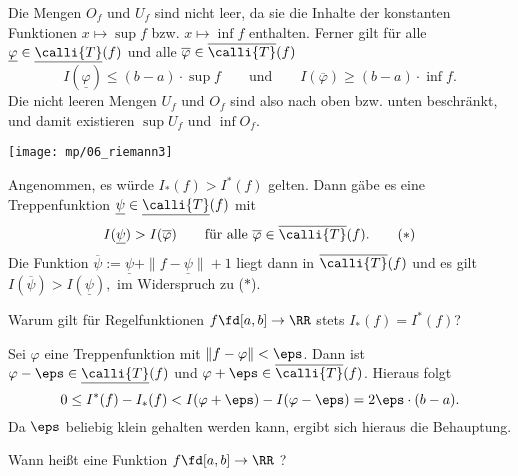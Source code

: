\begin{antwort}
Die Mengen $O_f$ und $U_f$ sind nicht leer, 
da sie die Inhalte der konstanten 
Funktionen $x\mapsto \sup f$ bzw. $x\mapsto \inf f$ enthalten. Ferner 
gilt für alle $\underline{\varphi}\in \underline{\calli{T}}(f)$ 
und alle $\overline{\varphi}\in \overline{\calli{T}}(f)$
\[
I(\underline{\varphi}) \le (b-a)\cdot \sup f 
\qquad\text{und}\qquad 
I(\overline{\varphi}) \ge (b-a)\cdot \inf f. 
\]
Die nicht leeren Mengen $U_f$ und $O_f$ sind also nach 
oben bzw. unten beschränkt, und damit existieren $\sup U_f$ und $\inf O_f$. 

\begin{center}
  \texttt{[image: mp/06\_riemann3]}
  \label{fig:06_riemann3}
\end{center}

Angenommen, es würde $I_* (f) > I^* (f)$ gelten. Dann gäbe es eine 
Treppenfunktion $\underline{\psi} \in \underline{\calli{T}}(f)$ mit 
\begin{equation}
I(\underline{\psi}) > I(\overline{\varphi}) \qquad\text {für alle 
$\overline{\varphi}\in \overline{\calli{T}}(f)$.} \tag{$\ast$}
\end{equation} 
Die Funktion 
$\overline{\psi} := \underline{\psi} + \| f-\underline{\psi} \| +1$ 
liegt dann in $\overline{\calli{T}}(f)$ und es gilt 
$I ( \overline{\psi} ) > I ( \underline{\psi} ),$
im Widerspruch zu ($\ast$).\AntEnd
\end{antwort}

\begin{frage}\label{regelrie}
Warum gilt für Regelfunktionen $f\fd[a,b]\to\RR$ 
stets $I_*(f) = I^*(f)$?
\end{frage}

\begin{antwort}
Sei $\varphi$ eine Treppenfunktion mit $\| f-\varphi \| < \eps$. 
Dann ist $\varphi-\eps \in \underline{\calli{T}}(f)$ und 
$\varphi+\eps \in \overline{\calli{T}}(f)$. Hieraus folgt
\[
0 \le I^* (f) - I_* (f) < I(\varphi+\eps) - I(\varphi-\eps) = 2\eps\cdot (b-a).
\]
Da $\eps$ beliebig klein gehalten werden kann, ergibt sich 
hieraus die Behauptung.
\AntEnd
\end{antwort}

\begin{frage}
Wann heißt eine Funktion $f\fd [a,b] \to \RR$ ?
\end{frage}

